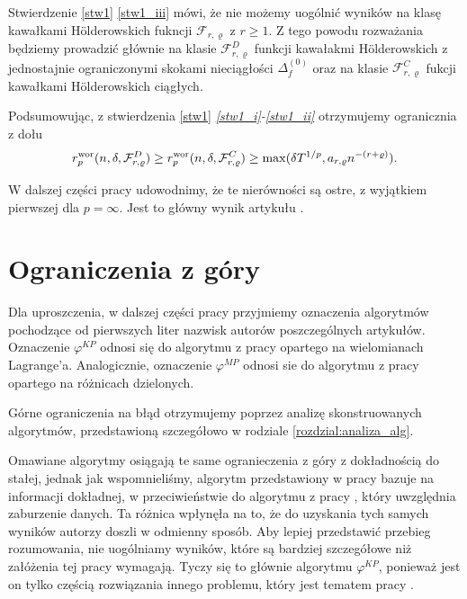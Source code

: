 \documentclass[oik, pdftex, man]{mgrwms}
\begin{document}
    Stwierdzenie \ref{stw1} \ref{stw1_iii} mówi, że nie możemy uogólnić wyników na klasę kawałkami Hölderowskich fukncji $\mathcal{F}_{r,\varrho}$ z $r \geq 1$. Z tego powodu rozważania będziemy prowadzić głównie na klasie $\mathcal{F}_{r,\varrho}^{D}$ funkcji kawałakmi Hölderowskich z jednostajnie ograniczonymi skokami nieciągłości $\Delta_{f}^{(0)}$ oraz na klasie $\mathcal{F}_{r,\varrho}^{C}$ fukcji kawałkami Hölderowskich ciągłych.

    Podsumowując, z stwierdzenia \ref{stw1} \textit{\ref{stw1_i}-\ref{stw1_ii}} otrzymujemy ogranicznia z dołu
    \begin{equation*}
        r^{\mathrm{wor}}_{p}(n, \delta, \mathcal{F}^{D}_{r,\varrho}) \geq r^{\mathrm{wor}}_{p}(n, \delta, \mathcal{F}^{C}_{r,\varrho}) \geq \max(\delta T^{1/p}, a_{r,\varrho} n^{-(r+\varrho)}).
    \end{equation*}

    W dalszej części pracy udowodnimy, że te nierówności są ostre, z wyjątkiem pierwszej dla $p=\infty$. Jest to główny wynik artykułu \cite{AoP}.


\section{Ograniczenia z góry}


    Dla uproszczenia, w dalszej części pracy przyjmiemy oznaczenia algorytmów pochodzące od pierwszych liter nazwisk autorów poszczególnych artykułów. Oznaczenie $\varphi^{KP}$ odnosi się do algorytmu z pracy \cite{CoDF} opartego na wielomianach Lagrange'a. Analogicznie, oznaczenie $\varphi^{MP}$ odnosi sie do algorytmu z pracy \cite{AoP} opartego na różnicach dzielonych.

    Górne ograniczenia na błąd otrzymujemy poprzez analizę skonstruowanych algorytmów, przedstawioną szczegółowo w rodziale \ref{rozdzial:analiza_alg}.
    
    Omawiane algorytmy osiągają te same ogranieczenia z góry z dokładnością do stałej, jednak jak wspomnieliśmy, algorytm przedstawiony w pracy \cite{CoDF} bazuje na informacji dokładnej, w przeciwieństwie do algorytmu z pracy \cite{AoP}, który uwzględnia zaburzenie danych. Ta różnica wpłynęła na to, że do uzyskania tych samych wyników autorzy doszli w odmienny sposób. Aby lepiej przedstawić przebieg rozumowania, nie uogólniamy wyników, które są bardziej szczegółowe niż załóżenia tej pracy wymagają. Tyczy się to głównie algorytmu $\varphi^{KP}$, ponieważ jest on tylko częścią rozwiązania innego problemu, który jest tematem pracy \cite{CoDF}.
\end{document}
